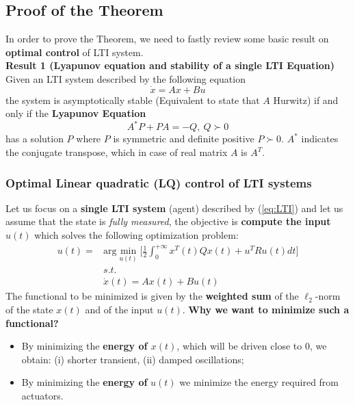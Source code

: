 \subsection{Proof of the Theorem}
In order to prove the Theorem, we need to fastly review some basic result on \textbf{optimal control} of LTI system.\\

\noindent
\textbf{Result 1 (Lyapunov equation and stability of a single LTI Equation)}
Given an LTI system described by the following equation 
\begin{equation}    \label{eq:LTI}
    \dot{x} = Ax + Bu
\end{equation}
the system is asymptotically stable (Equivalent to state that $A$ Hurwitz) if and only if the \textbf{Lyapunov Equation}
\begin{equation*}
    A^* P + PA = -Q, \ Q \succ 0
\end{equation*}
has a solution $P$ where $P$ is symmetric and definite positive $P\succ 0$. $A^*$ indicates the conjugate transpose, which in case of real matrix $A$ is $A^T$.

\subsubsection{Optimal Linear quadratic (LQ) control of LTI systems}
Let us focus on a \textbf{single LTI system} (agent) described by (\ref{eq:LTI}) and let us assume that the state is \textit{fully measured}, the objective is \textbf{compute the input $u(t)$} which solves the following optimization problem:
\begin{equation}
    \begin{aligned} \label{eq:LQ_Problem}
        u(t) = &\text{arg}\min_{u(t)} \bigg[
        \frac{1}{2} \int_0^{+\infty} {
            x^T(t)Qx(t) + u^T R u(t)
        } dt \bigg] \\
        &s.t. \\
        & \dot{x}(t) = Ax(t) + Bu(t)
    \end{aligned}
\end{equation}
The functional to be minimized is given by the \textbf{weighted sum} of the $\ell_2$-norm of the state $x(t)$ and of the input $u(t)$. \textbf{Why we want to minimize such a functional?}
\begin{itemize}
    \item By minimizing the \textbf{energy of $x(t)$}, which will be driven close to 0, we obtain: (i) shorter transient, (ii) damped oscillations; 
    \item By minimizing the \textbf{energy of} $u(t)$ we minimize the energy required from actuators.
\end{itemize}

